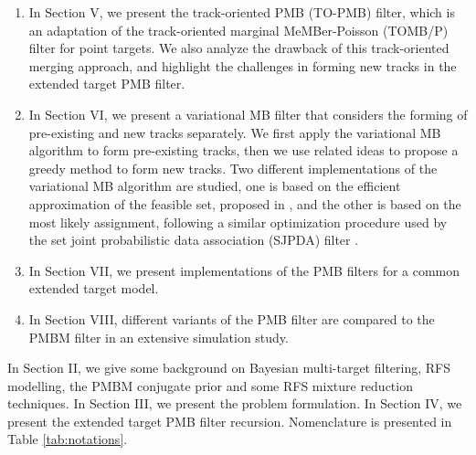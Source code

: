 \documentclass[journal]{IEEEtran}
\begin{document}


\begin{enumerate}
    \item In Section V, we present the track-oriented PMB (TO-PMB) filter, which is an adaptation of the track-oriented marginal MeMBer-Poisson (TOMB/P) filter \cite{pmbmpoint} for point targets. We also analyze the drawback of this track-oriented merging approach, and highlight the challenges in forming new tracks in the extended target PMB filter.
    \item In Section VI, we present a variational MB filter that considers the forming of pre-existing and new tracks separately. We first apply the variational MB algorithm \cite{variational} to form pre-existing tracks, then we use related ideas to propose a greedy method to form new tracks. Two different implementations of the variational MB algorithm are studied, one is based on the efficient approximation of the feasible set, proposed in \cite{variational}, and the other is based on the most likely assignment, following a similar optimization procedure used by the set joint probabilistic data association (SJPDA) filter \cite{sjpda}. 
    \item In Section VII, we present implementations of the PMB filters for a common extended target model. 
    \item In Section VIII, different variants of the PMB filter are compared to the PMBM filter in an extensive simulation study. 
\end{enumerate}
In Section II, we give some background on Bayesian multi-target filtering, RFS modelling, the PMBM conjugate prior and some RFS mixture reduction techniques. In Section III, we present the problem formulation. In Section IV, we present the extended target PMB filter recursion. Nomenclature is presented in Table \ref{tab:notations}. 
\end{document}
